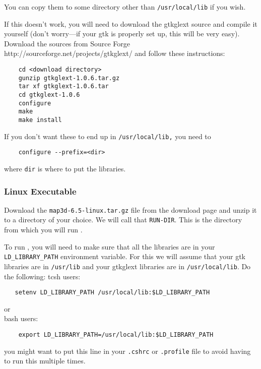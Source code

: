 You can copy them to some directory other than \texttt{/usr/local/lib} if
you wish.

If this doesn't work, you will need to download the gtkglext source and
compile it yourself (don't worry---if your gtk is properly set up, this
will be very easy).  Download the sources from Source Forge
{http://sourceforge.net/projects/gtkglext/} and follow these instructions:
%
\begin{verbatim}
    cd <download directory>
    gunzip gtkglext-1.0.6.tar.gz
    tar xf gtkglext-1.0.6.tar
    cd gtkglext-1.0.6
    configure
    make
    make install
\end{verbatim}

If you don't want these to end up in \texttt{/usr/local/lib,} you need to
%
\begin{verbatim}
    configure --prefix=<dir>
\end{verbatim}
%
where \texttt{dir} is where to put the libraries. 

\subsubsection{Linux Executable}

Download the \texttt{map3d-6.5-linux.tar.gz} file from the \map{} download page
and unzip it to a directory of your choice.  We will call that
\texttt{RUN-DIR}. This is the directory from which you will run \map{}.

To run \map{}, you will need to make sure that all the libraries are in
your \verb|LD_LIBRARY_PATH| environment variable.  For this we will assume
that your gtk libraries are in \texttt{/usr/lib} and your gtkglext
libraries are in \texttt{/usr/local/lib}.  Do the following:
%
tcsh users:
\begin{verbatim}
   setenv LD_LIBRARY_PATH /usr/local/lib:$LD_LIBRARY_PATH
\end{verbatim}
or\\
%
bash users:
\begin{verbatim} 
    export LD_LIBRARY_PATH=/usr/local/lib:$LD_LIBRARY_PATH
\end{verbatim}

you might want to put this line in your \texttt{.cshrc} or
\texttt{.profile} file to avoid having to run this multiple times.

